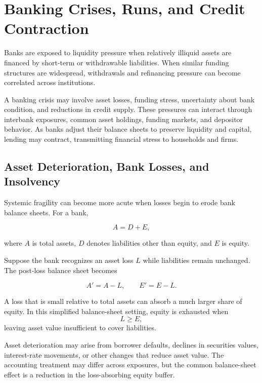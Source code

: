 \section{Banking Crises, Runs, and Credit Contraction}

Banks are exposed to liquidity pressure when relatively illiquid assets are financed by short-term or withdrawable liabilities. When similar funding structures are widespread, withdrawals and refinancing pressure can become correlated across institutions.

A banking crisis may involve asset losses, funding stress, uncertainty about bank condition, and reductions in credit supply. These pressures can interact through interbank exposures, common asset holdings, funding markets, and depositor behavior. As banks adjust their balance sheets to preserve liquidity and capital, lending may contract, transmitting financial stress to households and firms.

\subsection{Asset Deterioration, Bank Losses, and Insolvency}

Systemic fragility can become more acute when losses begin to erode bank balance sheets. For a bank,

\begin{equation}
A=D+E,
\label{eq:ch21-bank-balance-sheet}
\end{equation}

where \(A\) is total assets, \(D\) denotes liabilities other than equity, and \(E\) is equity.

Suppose the bank recognizes an asset loss \(L\) while liabilities remain unchanged. The post-loss balance sheet becomes

\begin{equation}
A'=A-L,
\qquad
E'=E-L.
\label{eq:ch21-bank-loss}
\end{equation}

A loss that is small relative to total assets can absorb a much larger share of equity. In this simplified balance-sheet setting, equity is exhausted when\[
L \geq E,
\]leaving asset value insufficient to cover liabilities.

Asset deterioration may arise from borrower defaults, declines in securities values, interest-rate movements, or other changes that reduce asset value. The accounting treatment may differ across exposures, but the common balance-sheet effect is a reduction in the loss-absorbing equity buffer.

